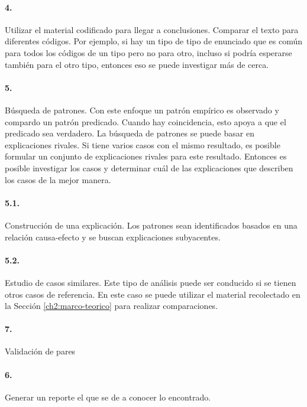 \paragraph{4.} Utilizar el material codificado para llegar a conclusiones. Comparar el texto para diferentes códigos. Por ejemplo, si hay un tipo de tipo de enunciado que es común para todos los códigos de un tipo pero no para otro, incluso si podría esperarse también para el otro tipo, entonces eso se puede investigar más de cerca.

\paragraph{5.} Búsqueda de patrones. Con este enfoque un patrón empírico es observado y compardo un patrón predicado. Cuando hay coincidencia, esto apoya a que el predicado sea verdadero. La búsqueda de patrones se puede basar en explicaciones rivales. Si tiene varios casos con el mismo resultado, es posible formular un conjunto de explicaciones rivales para este resultado. Entonces es posible investigar los casos y determinar cuál de las explicaciones que describen los casos de la mejor manera.

\paragraph{5.1.} Construcción de una explicación. Los patrones sean identificados basados en una relación causa-efecto y se buscan explicaciones subyacentes. 

\paragraph{5.2.} Estudio de casos similares. Este tipo de análisis puede ser conducido si se tienen otros casos de referencia. En este caso se puede utilizar el material recolectado en la Sección \ref{ch2:marco-teorico} para realizar comparaciones.


\paragraph{7.} Validación de pares

\paragraph{6.} Generar un reporte el que se de a conocer lo encontrado.
 